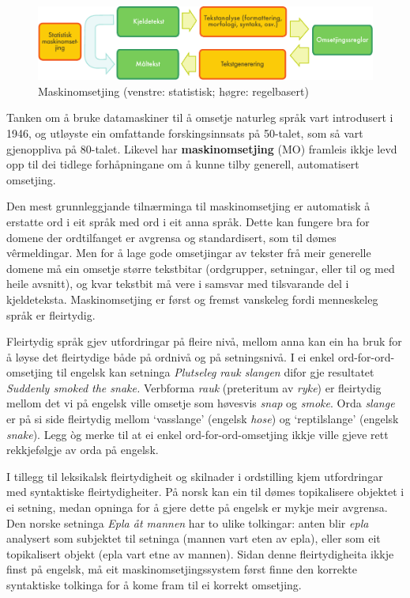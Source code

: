 \begin{multicols}{2}
\begin{figure}[htb]
  \center
  \includegraphics[width=\textwidth]{../_media/norwegian-nynorsk/machine_translation}
  \caption{Maskinomsetjing (venstre: statistisk; høgre: regelbasert)}
  \label{fig:mtarch_no}
\end{figure}

Tanken om å bruke datamaskiner til å omsetje naturleg språk vart introdusert i 1946, og utløyste ein omfattande forskingsinnsats på 50-talet, som så vart gjenoppliva på 80-talet. Likevel har \textbf{maskinomsetjing} (MO) framleis ikkje levd opp til dei tidlege forhåpningane om å kunne tilby generell, automatisert omsetjing.

Den mest grunnleggjande tilnærminga til maskinomsetjing er automatisk å erstatte ord i eit språk med ord i eit anna språk. Dette kan fungere bra for domene der ordtilfanget er avgrensa og standardisert, som til dømes vêrmeldingar. Men for å lage gode omsetjingar av tekster frå meir generelle domene må ein omsetje større tekstbitar (ordgrupper, setningar, eller til og med heile avsnitt), og kvar tekstbit må vere i samsvar med tilsvarande del i kjeldeteksta. Maskinomsetjing er først og fremst vanskeleg fordi menneskeleg språk er fleirtydig. 


Fleirtydig språk gjev utfordringar på fleire nivå, mellom anna  kan ein ha bruk for å løyse det fleirtydige både på ordnivå og på setningsnivå. 
I ei enkel ord-for-ord-omsetjing til engelsk kan setninga \textit{Plutseleg rauk slangen} difor gje resultatet \textit{Suddenly smoked the snake.}
Verbforma \textit{rauk} (preteritum av \textit{ryke}) er fleirtydig mellom det vi på engelsk ville omsetje som høvesvis \textit{snap} og \textit{smoke}.
Orda \textit{slange} er på si side fleirtydig mellom `vasslange' (engelsk \textit{hose}) og `reptilslange' (engelsk \textit{snake}). Legg òg merke til at ei enkel ord-for-ord-omsetjing ikkje ville gjeve rett rekkjefølgje av orda på engelsk.

I tillegg til leksikalsk fleirtydigheit og skilnader i ordstilling kjem utfordringar med syntaktiske fleirtydigheiter. På norsk kan ein til dømes topikalisere objektet i ei setning, medan opninga for å gjere dette på engelsk er mykje meir avgrensa. Den norske setninga \textit{Epla åt mannen} har to ulike tolkingar: anten blir \textit{epla} analysert som subjektet til setninga (mannen vart eten av epla), eller som eit topikalisert objekt (epla vart etne av mannen). Sidan denne fleirtydigheita ikkje finst på engelsk, må eit maskinomsetjingssystem først finne den korrekte syntaktiske tolkinga for å kome fram til ei korrekt omsetjing.


\end{multicols}
